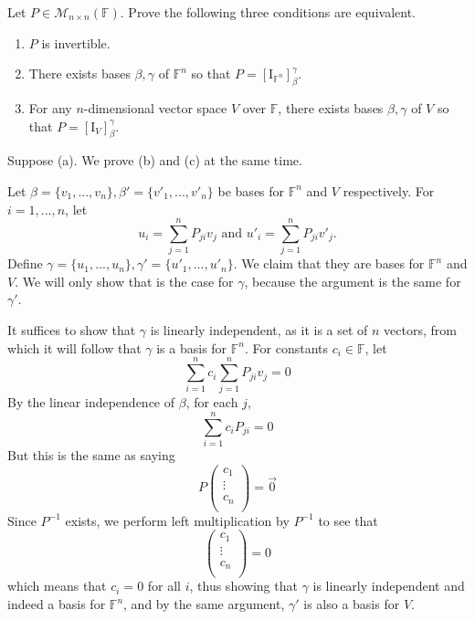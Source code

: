 \documentclass{eh-homework}
\begin{document}
    \begin{question}{8}
        Let \( P \in \mathcal{M}_{n \times n}(\mathbb{F}) \). Prove the following three conditions are equivalent.

        \begin{enumerate}[label=(\alph*)]
            \item \( P \) is invertible.
            \item There exists bases \( \beta, \gamma \) of \( \mathbb{F}^n \) so that \( P = [\mathrm{I}_{\mathbb{F}^n}]_\beta^\gamma \).
            \item For any \( n \)-dimensional vector space \( V \) over \( \mathbb{F} \), there exists bases \( \beta, \gamma \) of \( V \) so that \( P = [\mathrm{I}_V]_\beta^\gamma \).
        \end{enumerate}
        \tcblower

        Suppose (a). We prove (b) and (c) at the same time.

        Let \(\beta = \{ v_1, ..., v_n \}, \beta' = \{ v'_1, ..., v'_n \}\) be bases for \(\mathbb{F}^n\) and \(V\) respectively. For \(i = 1, ..., n\), let
        \[
            u_i = \sum_{j=1}^{n} P_{ji} v_j \text{ and } u'_i = \sum_{j=1}^{n} P_{ji} v'_j.
        \]
        Define \(\gamma = \{ u_1, ...,u_n \}, \gamma ' = \{ u'_1, ..., u'_n \}\). We claim that they are bases for \(\mathbb{F}^n\) and \(V\). We will only show that is the case for \(\gamma\), because the argument is the same for \(\gamma '\).

        It suffices to show that \(\gamma\) is linearly independent, as it is a set of \(n\) vectors, from which it will follow that \(\gamma\) is a basis for \(\mathbb{F}^n\). For constants \(c_i \in \mathbb{F}\), let
        \[
            \sum_{i=1}^{n} c_i \sum_{j=1}^{n} P_{ji} v_j = 0
        \]
        By the linear independence of \(\beta\), for each \(j\),
        \[
            \sum_{i=1}^{n} c_i P_{ji} = 0
        \]
        But this is the same as saying
        \[
            P \begin{pmatrix}
                 c_1 \\
                 \vdots \\
                 c_n \\
            \end{pmatrix}
            = \vec{0}
        \]
        Since \(P^{-1}\) exists, we perform left multiplication by \(P^{-1}\) to see that
        \[
            \begin{pmatrix}
                c_1 \\
                \vdots \\
                c_n \\
           \end{pmatrix} = 0
        \]
        which means that \(c_i = 0\) for all \(i\), thus showing that \(\gamma\) is linearly independent and indeed a basis for \(\mathbb{F}^n\), and by the same argument, \(\gamma'\) is also a basis for \(V\).


\end{question}
\end{document}
